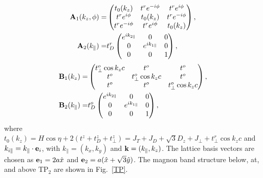 \documentclass[aps,twocolumn,amsmath,amssymb, superscriptaddress]{revtex4}
\def\bo{\bold{k}}
\begin{document}
\begin{align}
\bold{A}_1(k_z,\phi)=& 
\begin{pmatrix}
t_0(k_z)&t^r e^{-i\phi}&t^r e^{i\phi}\\
t^r e^{i\phi}&t_0(k_z)&t^r e^{-i\phi}\\
t^r e^{-i\phi}&t^r e^{i\phi}&t_0(k_z)
\end{pmatrix},\\
\bold{A}_2(k_\parallel)=&t^{r}_D
\begin{pmatrix}
 e^{ik_{2\parallel}}&0&0\\
0& e^{ik_{1\parallel}}&0\\
0&0&1
\end{pmatrix},
\end{align}
\begin{align}
\bold{B}_1(k_z)= &
\begin{pmatrix}
t_\perp^o\cos k_z c&t^o &t^o \\
t^o &t_\perp^o\cos k_z c&t^o \\
t^o &t^o &t_\perp^o\cos k_z c
\end{pmatrix},\\
\bold{B}_2(k_\parallel)=&t^o_D
\begin{pmatrix}
e^{ik_{2\parallel}}&0&0\\
0& e^{ik_{1\parallel}}&0\\
0&0&1\\
\end{pmatrix},
\end{align}
where $t_0(k_z)=H\cos\eta+2(t^z + t^{z}_D+t_\perp^{z})=J_T+J_D +\sqrt{3}D_z+J_\perp+t_\perp^r\cos k_z c$ and $k_{i\parallel}=k_\parallel\cdot \bold{e}_{i}$, with  $k_\parallel=(k_x,k_y)$ and  $\bo=(k_\parallel,k_z)$. The lattice basis vectors are chosen as $\bold e_1=2a\hat{x}$ and  $\bold e_2=a(\hat{x} + \sqrt{3}\hat{ y})$.  The magnon band structure below, at, and above TP$_2$ are shown in Fig.~\ref{TP}. 
\end{document}
